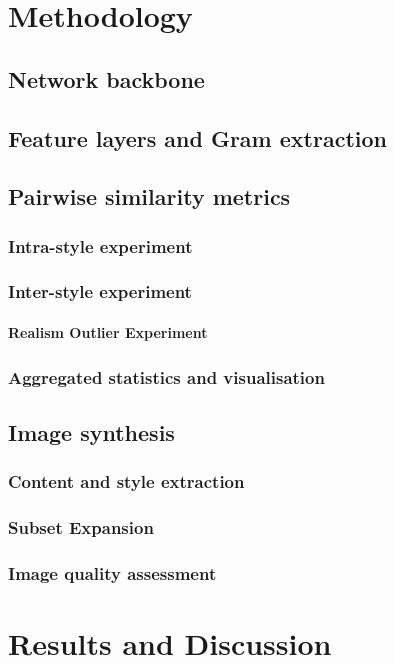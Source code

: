 \documentclass[11pt]{article}
\begin{document}
\section{Methodology}

\subsection{Network backbone}

\subsection{Feature layers and Gram extraction}

\subsection{Pairwise similarity metrics}

\subsubsection{Intra-style experiment}

\subsubsection{Inter-style experiment}

\paragraph{Realism Outlier Experiment}

\subsubsection{Aggregated statistics and visualisation}

\subsection{Image synthesis}

\subsubsection{Content and style extraction}

\subsubsection{Subset Expansion}

\subsubsection{Image quality assessment}

\section{Results and Discussion}
\end{document}
